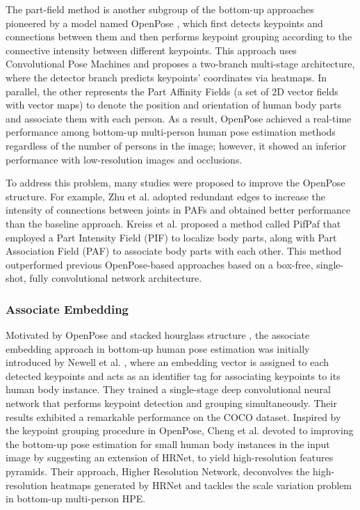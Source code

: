 The part-field method is another subgroup of the bottom-up approaches pioneered by a model named OpenPose \cite{cao_realtime_2017}, which first detects keypoints and connections between them and then performs keypoint grouping according to the connective intensity between different keypoints. This approach uses Convolutional Pose Machines \cite{wei_convolutional_2016} and proposes a two-branch multi-stage architecture, where the detector branch predicts keypoints’ coordinates via heatmaps. In parallel, the other represents the Part Affinity Fields (a set of 2D vector fields with vector maps) to denote the position and orientation of human body parts and associate them with each person. As a result, OpenPose achieved a real-time performance among bottom-up multi-person human pose estimation methods regardless of the number of persons in the image; however, it showed an inferior performance with low-resolution images and occlusions. 

To address this problem, many studies were proposed to improve the OpenPose structure. For example, Zhu et al. \cite{zhu_multi-person_nodate} adopted redundant edges to increase the intensity of connections between joints in PAFs and obtained better performance than the baseline approach. Kreiss et al. \cite{kreiss_pifpaf_2019} proposed a method called PifPaf that employed a Part Intensity Field (PIF) to localize body parts, along with Part Association Field (PAF) to associate body parts with each other. This method outperformed previous OpenPose-based approaches based on a box-free, single-shot, fully convolutional network architecture. 

\subsubsection{Associate Embedding} 

Motivated by OpenPose \cite{cao_realtime_2017} and stacked hourglass structure \cite{newell_stacked_2016}, the associate embedding approach in bottom-up human pose estimation was initially introduced by Newell et al. \cite{newell_associative_2017}, where an embedding vector is assigned to each detected keypoints and acts as an identifier tag for associating keypoints to its human body instance. They trained a single-stage deep convolutional neural network that performs keypoint detection and grouping simultaneously. Their results exhibited a remarkable performance on the COCO dataset. Inspired by the keypoint grouping procedure in OpenPose, Cheng et al. \cite{cheng_higherhrnet_2020} devoted to improving the bottom-up pose estimation for small human body instances in the input image by suggesting an extension of HRNet, to yield high-resolution features pyramids. Their approach, Higher Resolution Network, deconvolves the high-resolution heatmaps generated by HRNet and tackles the scale variation problem in bottom-up multi-person HPE. 

